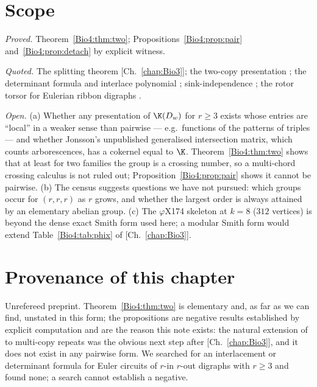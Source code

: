 \section{Scope}\label{Bio4:sec:scope}

\emph{Proved.} Theorem~\ref{Bio4:thm:two}; Propositions~\ref{Bio4:prop:pair}
and~\ref{Bio4:prop:detach} by explicit witness.

\emph{Quoted.} The splitting theorem [Ch.~\ref{chap:Bio3}]; the two-copy presentation \cite{MMN};
the determinant formula \cite{MacrisPule,Jonsson} and interlace polynomial \cite{ABS};
sink-independence \cite{HLMPPW}; the rotor torsor for Eulerian ribbon digraphs
\cite{Toth}.

\emph{Open.} (a) Whether any presentation of $\K(D_w)$ for $r\ge3$ exists whose entries
are ``local'' in a weaker sense than pairwise --- e.g.\ functions of the patterns of
triples --- and whether Jonsson's unpublished generalised intersection matrix, which
counts arborescences, has a cokernel equal to $\K$. Theorem~\ref{Bio4:thm:two} shows that at
least for two families the group is a crossing number, so a multi-chord crossing calculus
is not ruled out; Proposition~\ref{Bio4:prop:pair} shows it cannot be pairwise. (b) The
census suggests questions we have not pursued: which groups occur for $(r,r,r)$ as $r$
grows, and whether the largest order is always attained by an elementary abelian group.
(c) The $\varphi$X174 skeleton at $k=8$ ($312$ vertices) is beyond the dense exact Smith
form used here; a modular Smith form would extend Table~\ref{Bio4:tab:phix} of [Ch.~\ref{chap:Bio3}].

\section*{Provenance of this chapter}

Unrefereed preprint. Theorem~\ref{Bio4:thm:two} is elementary and, as far as we can find,
unstated in this form; the propositions are negative results established by explicit
computation and are the reason this note exists: the natural extension of \cite{MMN} to
multi-copy repeats was the obvious next step after [Ch.~\ref{chap:Bio3}], and it does not exist in
any pairwise form. We searched for an interlacement or determinant formula for Euler
circuits of $r$-in $r$-out digraphs with $r\ge3$ and found none; a search cannot
establish a negative.
